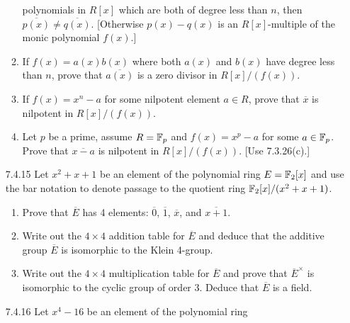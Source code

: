 \begin{enumerate}
\begin{enumerate}
                           polynomials in $R[x]$ which are both of degree less
                           than $n$, then $\overline{p(x)} \neq\overline{q(x)}$.
                           [Otherwise $p(x) - q(x)$ is an $R[x]$-multiple of the
                           monic polynomial $f(x)$.]
                     \item If $f(x) = a(x)b(x)$ where both $a(x)$ and $b(x)$
                           have degree less than $n$, prove that
                           $\overline{a(x)}$ is a zero divisor in $R[x]/(f(x))$.
                     \item If $f(x) = x^n - a$ for some nilpotent element
                           $a \in R$, prove that $\overline{x}$ is nilpotent in
                           $R[x]/(f(x))$.
                     \item Let $p$ be a prime, assume $R = \mathbb{F}_p$ and
                           $f(x) = x^p - a$ for some $a \in \mathbb{F}_p$. Prove that
                           $\overline{x-a}$ is nilpotent in $R[x]/(f(x))$. [Use
                           7.3.26(c).]
                  \end{enumerate}
   \item[7.4.15]  Let $x^2 + x + 1$ be an element of the polynomial ring
                  $E = \mathbb{F}_2[x]$ and use the bar notation to denote passage to 
                  the quotient ring $\mathbb{F}_2[x]/(x^2 + x + 1)$.
                  \begin{enumerate}
                     \item Prove that $\overline{E}$ has 4 elements:
                           $\overline{0}$, $\overline{1}$, $\overline{x}$, and
                           $\overline{x+1}$.
                     \item Write out the $4 \times 4$ addition table for
                           $\overline{E}$ and deduce that the additive group
                           $\overline{E}$ is isomorphic to the Klein 4-group.
                     \item Write out the $4 \times 4$ multiplication table for
                           $\overline{E}$ and prove that $\overline{E}^\times$
                           is isomorphic to the cyclic group of order 3. Deduce
                           that $\overline{E}$ is a field.
                  \end{enumerate}
   \item[7.4.16]  Let $x^4 - 16$ be an element of the polynomial ring

\end{enumerate}
